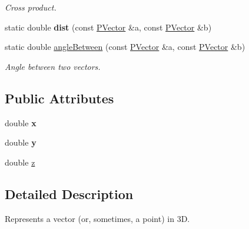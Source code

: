 \begin{DoxyCompactItemize}
\begin{DoxyCompactList}\small\item\em \-Cross product. \end{DoxyCompactList}\item 
\hypertarget{classcprocessing_1_1PVector_a2a2368018222928ef230c47582fe1b8c}{static double {\bfseries dist} (const \hyperlink{classcprocessing_1_1PVector}{\-P\-Vector} \&a, const \hyperlink{classcprocessing_1_1PVector}{\-P\-Vector} \&b)}\label{classcprocessing_1_1PVector_a2a2368018222928ef230c47582fe1b8c}

\item 
\hypertarget{classcprocessing_1_1PVector_a49b52fe0b002b3e0846d12edbc21a4b4}{static double \hyperlink{classcprocessing_1_1PVector_a49b52fe0b002b3e0846d12edbc21a4b4}{angle\-Between} (const \hyperlink{classcprocessing_1_1PVector}{\-P\-Vector} \&a, const \hyperlink{classcprocessing_1_1PVector}{\-P\-Vector} \&b)}\label{classcprocessing_1_1PVector_a49b52fe0b002b3e0846d12edbc21a4b4}

\begin{DoxyCompactList}\small\item\em \-Angle between two vectors. \end{DoxyCompactList}\end{DoxyCompactItemize}
\subsection*{\-Public \-Attributes}
\begin{DoxyCompactItemize}
\item 
\hypertarget{classcprocessing_1_1PVector_a8cde2eb83b92d0d7b21b335ff6fd62fe}{double {\bfseries x}}\label{classcprocessing_1_1PVector_a8cde2eb83b92d0d7b21b335ff6fd62fe}

\item 
\hypertarget{classcprocessing_1_1PVector_abb08a1c7f21e21d2c1557d26722a9a02}{double {\bfseries y}}\label{classcprocessing_1_1PVector_abb08a1c7f21e21d2c1557d26722a9a02}

\item 
double \hyperlink{classcprocessing_1_1PVector_a28310efbe3ee03e9d5c01e5869428f70}{z}
\end{DoxyCompactItemize}


\subsection{\-Detailed \-Description}
\-Represents a vector (or, sometimes, a point) in 3\-D. 

